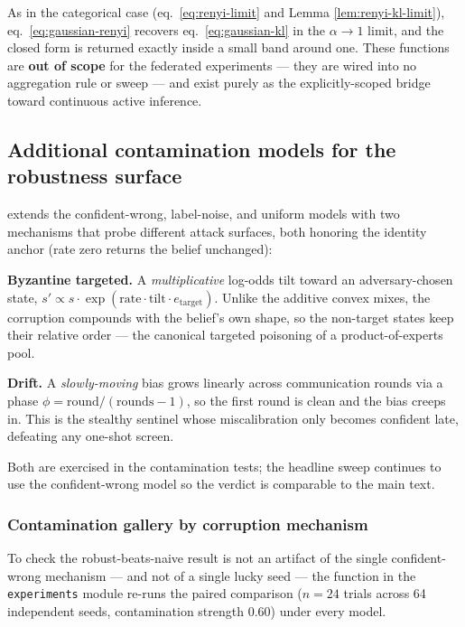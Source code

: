 \documentclass[
  english,
]{article}
\theoremstyle{plain}
\theoremstyle{definition}
\theoremstyle{remark}
\theoremstyle{definition}
\begin{document}
As in the categorical case (eq.~\ref{eq:renyi-limit} and Lemma
\ref{lem:renyi-kl-limit}), eq.~\ref{eq:gaussian-renyi} recovers
eq.~\ref{eq:gaussian-kl} in the \(\alpha\to1\) limit, and the closed
form is returned exactly inside a small band around one. These functions
are \textbf{out of scope} for the federated experiments --- they are
wired into no aggregation rule or sweep --- and exist purely as the
explicitly-scoped bridge toward continuous active inference.

\subsection{Additional contamination models for the robustness
surface}\label{sec:supp-contamination}

 extends the confident-wrong, label-noise, and
uniform models with two mechanisms that probe different attack surfaces,
both honoring the identity anchor (rate zero returns the belief
unchanged):

\textbf{Byzantine targeted.} A \emph{multiplicative} log-odds tilt
toward an adversary-chosen state,
\(s' \propto s\cdot\exp(\text{rate}\cdot\text{tilt}\cdot e_{\text{target}})\).
Unlike the additive convex mixes, the corruption compounds with the
belief's own shape, so the non-target states keep their relative order
--- the canonical targeted poisoning of a product-of-experts pool.

\textbf{Drift.} A \emph{slowly-moving} bias grows linearly across
communication rounds via a phase
\(\phi = \text{round}/(\text{rounds}-1)\), so the first round is clean
and the bias creeps in. This is the stealthy sentinel whose
miscalibration only becomes confident late, defeating any one-shot
screen.

Both are exercised in the contamination tests; the headline sweep
continues to use the confident-wrong model so the verdict is comparable
to the main text.

\subsubsection{Contamination gallery by corruption
mechanism}\label{sec:supp-gallery}

To check the robust-beats-naive result is not an artifact of the single
confident-wrong mechanism --- and not of a single lucky seed --- the
 function in the
\texttt{experiments} module re-runs the paired comparison (\(n = 24\)
trials across 64 independent seeds, contamination strength 0.60) under
every model.
\end{document}
